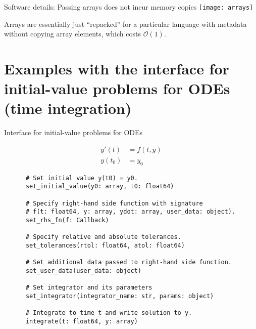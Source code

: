 \documentclass[
  10pt,
  aspectratio=169,
  english,
]{beamer}
\begin{document}
\begin{frame}{Software details: Passing arrays does not incur memory copies}
  \centering
  \texttt{[image: arrays]}

  Arrays are essentially just ``repacked'' for a particular language
  with metadata without copying array elements, which costs $\mathcal O(1)$.
\end{frame}

\section{Examples with the interface for initial-value problems for ODEs (time integration)}

\begin{frame}[fragile]{Interface for initial-value problems for ODEs}
  \begin{minipage}{\dimexpr0.22\textwidth-2\tabcolsep}
    \begin{align*}
      y'(t)  & = f(t, y) \\
      y(t_0) & = y_0
    \end{align*}
  \end{minipage}
  \begin{minipage}{\dimexpr0.73\textwidth-2\tabcolsep}
    {\footnotesize
    \begin{verbatim}
      # Set initial value y(t0) = y0.
      set_initial_value(y0: array, t0: float64)

      # Specify right-hand side function with signature
      # f(t: float64, y: array, ydot: array, user_data: object).
      set_rhs_fn(f: Callback)

      # Specify relative and absolute tolerances.
      set_tolerances(rtol: float64, atol: float64)

      # Set additional data passed to right-hand side function.
      set_user_data(user_data: object)

      # Set integrator and its parameters
      set_integrator(integrator_name: str, params: object)

      # Integrate to time t and write solution to y.
      integrate(t: float64, y: array)
    \end{verbatim}
    }
  \end{minipage}
\end{frame}
\end{document}
